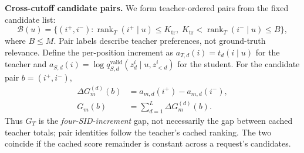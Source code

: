 \documentclass[sigconf, anonymous, review]{acmart}
\begin{document}
\textbf{Cross-cutoff candidate pairs.} We form teacher-ordered pairs
from the fixed candidate list:
\begin{equation}
\mathcal B(u)=\{(i^+,i^-):
\operatorname{rank}_T(i^+\mid u)\le K_{\mathrm{tr}},\;
K_{\mathrm{tr}}<\operatorname{rank}_T(i^-\mid u)\le B\},
\label{eq:pairs}
\end{equation}
where $B\le M$. Pair labels describe teacher preferences, not
ground-truth relevance. Define the per-position increment as
$a_{T,d}(i)=t_d(i\mid u)$ for the teacher and
$a_{S,d}(i)=\log q^{\mathrm{valid}}_{S,d}
(z_d^i\mid u,z_{<d}^i)$ for the student.
For the candidate pair $b=(i^+,i^-)$,
\begin{equation}
\begin{aligned}
\Delta G_m^{(d)}(b)&=a_{m,d}(i^+)-a_{m,d}(i^-),\\
G_m(b)&=\sum_{d=1}^{L}\Delta G_m^{(d)}(b).
\end{aligned}
\label{eq:pairs-gap}
\end{equation}
Thus $G_T$ is the \emph{four-SID-increment} gap, not
necessarily the gap between cached teacher totals; pair identities
follow the teacher's cached ranking. The two coincide if the
cached score remainder is constant across a request's candidates.
\end{document}
